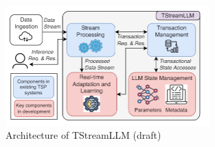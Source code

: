 \documentclass[runningheads]{llncs}
\begin{document}
\begin{figure}[]
  \centering
  \includegraphics[width=0.7\textwidth]{TStreamLLM architecture.png}
  \caption{Architecture of TStreamLLM (draft) \cite{Zhang24}}
  \label{fig:TStreamLLM}
\end{figure}
\end{document}
